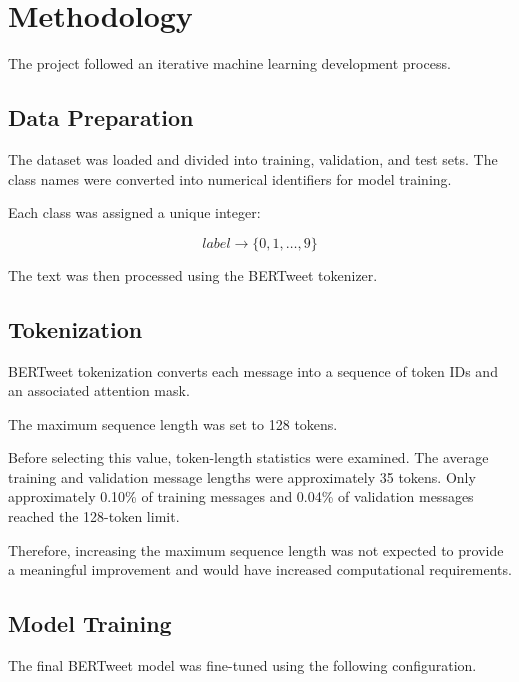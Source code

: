\documentclass[12pt,a4paper]{article}
\begin{document}
\section{Methodology}

The project followed an iterative machine learning development process.

\subsection{Data Preparation}

The dataset was loaded and divided into training, validation, and test sets.
The class names were converted into numerical identifiers for model training.

Each class was assigned a unique integer:

\begin{equation}
label \rightarrow \{0,1,\ldots,9\}
\end{equation}

The text was then processed using the BERTweet tokenizer.

\subsection{Tokenization}

BERTweet tokenization converts each message into a sequence of token IDs and
an associated attention mask.

The maximum sequence length was set to 128 tokens.

Before selecting this value, token-length statistics were examined. The
average training and validation message lengths were approximately 35 tokens.
Only approximately 0.10\% of training messages and 0.04\% of validation
messages reached the 128-token limit.

Therefore, increasing the maximum sequence length was not expected to provide
a meaningful improvement and would have increased computational requirements.

\subsection{Model Training}

The final BERTweet model was fine-tuned using the following configuration.
\end{document}
